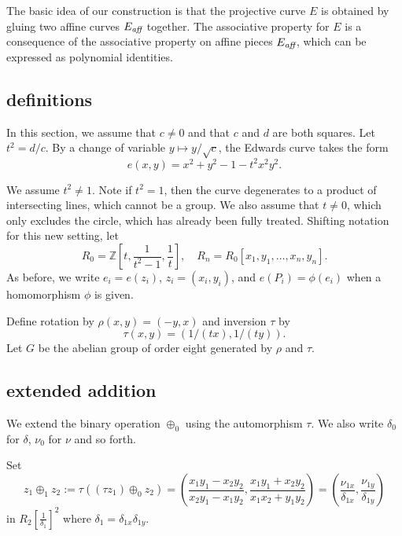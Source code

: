 \documentclass{llncs}
\newcommand{\ring}[1]{\mathbb{#1}}
\newcommand{\op}[1]{\hbox{#1}}
\newcommand{\f}[1]{\frac{1}{#1}}
\newcommand{\Eaff}{E_{\op{\scriptsize\it aff}}}
\begin{document}
The basic idea of our construction is that the projective
curve $E$ is obtained by gluing two affine curves $\Eaff$
together.  The associative property for $E$ is a consequence
of the associative property on affine pieces $\Eaff$, which
can be expressed as polynomial identities.



\subsection{definitions}\label{sec:defs}

In this section, we assume that $c\ne 0$ and that $c$ and $d$ are both
squares.  Let $t^2 = d/c$.  By a change of variable $y\mapsto
y/\sqrt{c}$, the Edwards curve takes the form
\begin{equation}\label{eqn:t}
e(x,y)= x^2 + y^2 -1 - t^2 x^2 y^2.
\end{equation}

We assume $t^2\ne 1$.  Note if $t^2=1$, then 
the curve degenerates to a product of intersecting lines, which
cannot be a group.  We also assume that $t\ne 0$, which only excludes the
circle, which has already been fully treated.  Shifting notation for
this new setting, let
\[
R_0 = \ring{Z}[t,\frac{1}{t^2-1},\frac1t],\quad
R_n = R_0[x_1,y_1,\ldots,x_n,y_n].
\]
As before, we write $e_i = e(z_i)$, $z_i=(x_i,y_i)$, and $ e(P_i) =
\phi(e_i)$ when a homomorphism $\phi$ is given.

Define rotation by $\rho(x,y)=(-y,x)$ and inversion $\tau$ by
\[
\tau(x,y) = (1/(tx),1/(ty)).
\]
Let $G$ be the abelian group of order eight generated by $\rho$ and
$\tau$.


\subsection{extended addition}

We extend the binary operation $\oplus_0$ using the automorphism $\tau$.
We also write $\delta_0$ for
$\delta$, $\nu_0$ for $\nu$ and so forth.

Set
\begin{equation}\label{eqn:tauplus}
  z_1\oplus_1 z_2 := \tau((\tau z_1)\oplus_0 z_2)=
  \left(\frac{x_1y_1 - x_2 y_2}{x_2
    y_1-x_1 y_2},\frac{x_1 y_1 + x_2 y_2}{x_1 x_2 + y_1 y_2}\right) 
= (\frac{\nu_{1x}}{\delta_{1x}},\frac{\nu_{1y}}{\delta_{1y}})
\end{equation}
in $R_2[\f{\delta_1}]^2$ where $\delta_1 = \delta_{1x}\delta_{1y}$.
\end{document}
